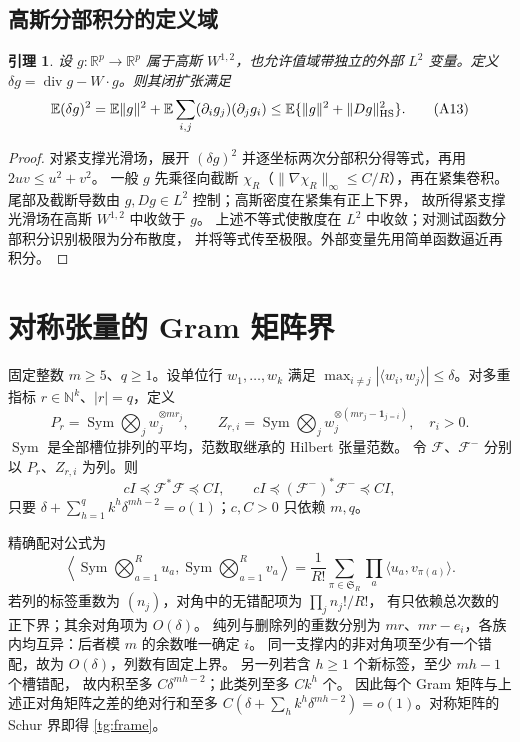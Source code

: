 \documentclass[a4paper]{tufte-handout}
\newtheorem{lemma}{引理}
\begin{document}
\begin{fullwidth}
\subsection{高斯分部积分的定义域}
\begin{lemma}\label{an:sobolev}
设 $g:\mathbb R^p\to\mathbb R^p$ 属于高斯 $W^{1,2}$，也允许值域带独立的外部 $L^2$ 变量。定义
$\delta g=\operatorname{div}g-W\cdot g$。则其闭扩张满足
\[
 \mathbb E(\delta g)^2
 =\mathbb E\|g\|^2+\mathbb E\sum_{i,j}(\partial_i g_j)(\partial_jg_i)
 \le\mathbb E\{\|g\|^2+\|Dg\|_{\rm HS}^2\}. \tag{A13}\label{an:divergence}
\]
\end{lemma}
\begin{proof}
对紧支撑光滑场，展开 $(\delta g)^2$ 并逐坐标两次分部积分得等式，再用 $2uv\le u^2+v^2$。
一般 $g$ 先乘径向截断 $\chi_R$（$\|\nabla\chi_R\|_\infty\le C/R$），再在紧集卷积。
尾部及截断导数由 $g,Dg\in L^2$ 控制；高斯密度在紧集有正上下界，
故所得紧支撑光滑场在高斯 $W^{1,2}$ 中收敛于 $g$。
上述不等式使散度在 $L^2$ 中收敛；对测试函数分部积分识别极限为分布散度，
并将等式传至极限。外部变量先用简单函数逼近再积分。
\end{proof}


\section{对称张量的 Gram 矩阵界}\label{tg:section}
固定整数 $m\ge5$、$q\ge1$。设单位行 $w_1,\ldots,w_k$ 满足
$\max_{i\ne j}|\langle w_i,w_j\rangle|\le\delta$。对多重指标 $r\in\mathbb N^k$、$|r|=q$，定义
\[
 P_r=\operatorname{Sym}\bigotimes_jw_j^{\otimes mr_j},\qquad
 Z_{r,i}=\operatorname{Sym}\bigotimes_jw_j^{\otimes(mr_j-\mathbf1_{j=i})},\quad r_i>0.
\]
$\operatorname{Sym}$ 是全部槽位排列的平均，范数取继承的 Hilbert 张量范数。
令 $\mathcal F$、$\mathcal F^-$ 分别以 $P_r$、$Z_{r,i}$ 为列。则
\begin{equation}\label{tg:frame}
 cI\preceq\mathcal F^*\mathcal F\preceq CI,\qquad
 cI\preceq(\mathcal F^-)^*\mathcal F^-\preceq CI,
\end{equation}
只要 $\delta+\sum_{h=1}^q k^h\delta^{mh-2}=o(1)$；$c,C>0$ 只依赖 $m,q$。

精确配对公式为
\[
 \left\langle\operatorname{Sym}\bigotimes_{a=1}^Ru_a,
 \operatorname{Sym}\bigotimes_{a=1}^Rv_a\right\rangle
 =\frac1{R!}\sum_{\pi\in\mathfrak S_R}\prod_a\langle u_a,v_{\pi(a)}\rangle.
\]
若列的标签重数为 $(n_j)$，对角中的无错配项为 $\prod_jn_j!/R!$，
有只依赖总次数的正下界；其余对角项为 $O(\delta)$。
纯列与删除列的重数分别为 $mr$、$mr-e_i$，各族内均互异：后者模 $m$ 的余数唯一确定 $i$。
同一支撑内的非对角项至少有一个错配，故为 $O(\delta)$，列数有固定上界。
另一列若含 $h\ge1$ 个新标签，至少 $mh-1$ 个槽错配，
故内积至多 $C\delta^{mh-2}$；此类列至多 $Ck^h$ 个。
因此每个 Gram 矩阵与上述正对角矩阵之差的绝对行和至多
$C(\delta+\sum_hk^h\delta^{mh-2})=o(1)$。对称矩阵的 Schur 界即得 \eqref{tg:frame}。


\end{fullwidth}
\end{document}
